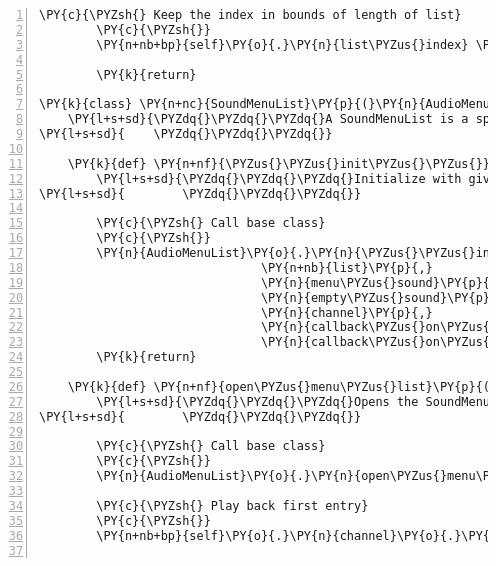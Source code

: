 \begin{Verbatim}[commandchars=\\\{\},numbers=left,firstnumber=1,stepnumber=1]
        \PY{c}{\PYZsh{} Keep the index in bounds of length of list}
        \PY{c}{\PYZsh{}}
        \PY{n+nb+bp}{self}\PY{o}{.}\PY{n}{list\PYZus{}index} \PY{o}{\PYZpc{}}\PY{o}{=} \PY{n+nb}{len}\PY{p}{(}\PY{n+nb+bp}{self}\PY{o}{.}\PY{n}{list}\PY{p}{)}

        \PY{k}{return}

\PY{k}{class} \PY{n+nc}{SoundMenuList}\PY{p}{(}\PY{n}{AudioMenuList}\PY{p}{)}\PY{p}{:}
    \PY{l+s+sd}{\PYZdq{}\PYZdq{}\PYZdq{}A SoundMenuList is a specific AudioMenuList whose list is supposed to contain pygame.mixer.Sounds.}
\PY{l+s+sd}{    \PYZdq{}\PYZdq{}\PYZdq{}}

    \PY{k}{def} \PY{n+nf}{\PYZus{}\PYZus{}init\PYZus{}\PYZus{}}\PY{p}{(}\PY{n+nb+bp}{self}\PY{p}{,} \PY{n+nb}{list}\PY{p}{,} \PY{n}{menu\PYZus{}sound}\PY{p}{,} \PY{n}{empty\PYZus{}sound}\PY{p}{,} \PY{n}{channel}\PY{p}{,} \PY{n}{callback\PYZus{}on\PYZus{}entry\PYZus{}selected}\PY{p}{,} \PY{n}{callback\PYZus{}on\PYZus{}exit}\PY{p}{)}\PY{p}{:}
        \PY{l+s+sd}{\PYZdq{}\PYZdq{}\PYZdq{}Initialize with given parameters.}
\PY{l+s+sd}{        \PYZdq{}\PYZdq{}\PYZdq{}}

        \PY{c}{\PYZsh{} Call base class}
        \PY{c}{\PYZsh{}}
        \PY{n}{AudioMenuList}\PY{o}{.}\PY{n}{\PYZus{}\PYZus{}init\PYZus{}\PYZus{}}\PY{p}{(}\PY{n+nb+bp}{self}\PY{p}{,}
                               \PY{n+nb}{list}\PY{p}{,}
                               \PY{n}{menu\PYZus{}sound}\PY{p}{,}
                               \PY{n}{empty\PYZus{}sound}\PY{p}{,}
                               \PY{n}{channel}\PY{p}{,}
                               \PY{n}{callback\PYZus{}on\PYZus{}entry\PYZus{}selected}\PY{p}{,}
                               \PY{n}{callback\PYZus{}on\PYZus{}exit}\PY{p}{)}
        \PY{k}{return}

    \PY{k}{def} \PY{n+nf}{open\PYZus{}menu\PYZus{}list}\PY{p}{(}\PY{n+nb+bp}{self}\PY{p}{)}\PY{p}{:}
        \PY{l+s+sd}{\PYZdq{}\PYZdq{}\PYZdq{}Opens the SoundMenuList and plays the first sound at index 0.}
\PY{l+s+sd}{        \PYZdq{}\PYZdq{}\PYZdq{}}

        \PY{c}{\PYZsh{} Call base class}
        \PY{c}{\PYZsh{}}
        \PY{n}{AudioMenuList}\PY{o}{.}\PY{n}{open\PYZus{}menu\PYZus{}list}\PY{p}{(}\PY{n+nb+bp}{self}\PY{p}{)}

        \PY{c}{\PYZsh{} Play back first entry}
        \PY{c}{\PYZsh{}}
        \PY{n+nb+bp}{self}\PY{o}{.}\PY{n}{channel}\PY{o}{.}\PY{n}{play}\PY{p}{(}\PY{n+nb+bp}{self}\PY{o}{.}\PY{n}{list}\PY{p}{[}\PY{n+nb+bp}{self}\PY{o}{.}\PY{n}{list\PYZus{}index}\PY{p}{]}\PY{p}{)}


\end{Verbatim}
